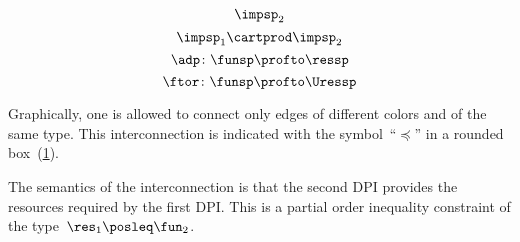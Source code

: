 {\begin{forslides}
\begin{equation}
            \impsp_2
        \end{equation}
        \begin{equation}
            \label{eq:impsp12}
            \impsp_{1} \cartprod \impsp_{2}
        \end{equation}
        \begin{equation}
            \label{eq:dproba}
            \adp \colon \funsp \profto \ressp
        \end{equation}
        \begin{equation}
            \label{eq:dprob2}
            \ftor \colon \funsp \profto \Uressp
        \end{equation}
    \end{forslides}
}

Graphically, one is allowed to connect only edges of different colors and of the same type.
This interconnection is indicated with the symbol~``$\preceq$'' in a rounded box~(\cref{fig:connection}).

\begin{figure}[h]
    \centering
    \caption{}
    \label{fig:connection}
\end{figure}


The semantics of the interconnection is that the second DPI provides the resources required by the first DPI.
This is a partial order inequality constraint of the type~$\res_{1}\posleq\fun_{2}$.

